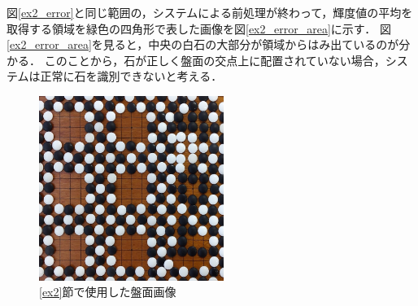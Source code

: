 \documentclass[summary]{nitocs}
\numberwithin{equation}{section}
\begin{document}
            図\ref{ex2_error}と同じ範囲の，システムによる前処理が終わって，輝度値の平均を取得する領域を緑色の四角形で表した画像を図\ref{ex2_error_area}に示す．
            図\ref{ex2_error_area}を見ると，中央の白石の大部分が領域からはみ出ているのが分かる．
            このことから，石が正しく盤面の交点上に配置されていない場合，システムは正常に石を識別できないと考える．
            
            \begin{figure}[tb] %
                \begin{center}
                \includegraphics[clip,width=60mm]{DSC_0099/boardImg.jpg} 
                \caption{\ref{ex2}節で使用した盤面画像}
                \label{ex2_img}
                \end{center}
            \end{figure}
\end{document}
